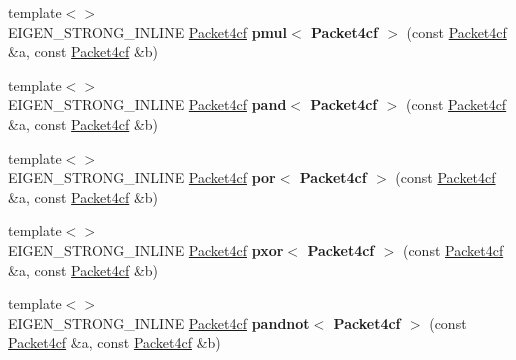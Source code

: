 \begin{DoxyCompactItemize}
\item 
\mbox{\label{namespace_eigen_1_1internal_ad00c03c68ed4f72f2e2a05287fa0cc55}} 
{\footnotesize template$<$$>$ }\\E\+I\+G\+E\+N\+\_\+\+S\+T\+R\+O\+N\+G\+\_\+\+I\+N\+L\+I\+NE \hyperlink{struct_eigen_1_1internal_1_1_packet4cf}{Packet4cf} {\bfseries pmul$<$ Packet4cf $>$} (const \hyperlink{struct_eigen_1_1internal_1_1_packet4cf}{Packet4cf} \&a, const \hyperlink{struct_eigen_1_1internal_1_1_packet4cf}{Packet4cf} \&b)
\item 
\mbox{\label{namespace_eigen_1_1internal_a61c66abe757d9226ade245a7aa933ecc}} 
{\footnotesize template$<$$>$ }\\E\+I\+G\+E\+N\+\_\+\+S\+T\+R\+O\+N\+G\+\_\+\+I\+N\+L\+I\+NE \hyperlink{struct_eigen_1_1internal_1_1_packet4cf}{Packet4cf} {\bfseries pand$<$ Packet4cf $>$} (const \hyperlink{struct_eigen_1_1internal_1_1_packet4cf}{Packet4cf} \&a, const \hyperlink{struct_eigen_1_1internal_1_1_packet4cf}{Packet4cf} \&b)
\item 
\mbox{\label{namespace_eigen_1_1internal_aeabd400bbc8d481593a93d825b3aa3c7}} 
{\footnotesize template$<$$>$ }\\E\+I\+G\+E\+N\+\_\+\+S\+T\+R\+O\+N\+G\+\_\+\+I\+N\+L\+I\+NE \hyperlink{struct_eigen_1_1internal_1_1_packet4cf}{Packet4cf} {\bfseries por$<$ Packet4cf $>$} (const \hyperlink{struct_eigen_1_1internal_1_1_packet4cf}{Packet4cf} \&a, const \hyperlink{struct_eigen_1_1internal_1_1_packet4cf}{Packet4cf} \&b)
\item 
\mbox{\label{namespace_eigen_1_1internal_a44b281130b1a609b17f9bd126fa2573d}} 
{\footnotesize template$<$$>$ }\\E\+I\+G\+E\+N\+\_\+\+S\+T\+R\+O\+N\+G\+\_\+\+I\+N\+L\+I\+NE \hyperlink{struct_eigen_1_1internal_1_1_packet4cf}{Packet4cf} {\bfseries pxor$<$ Packet4cf $>$} (const \hyperlink{struct_eigen_1_1internal_1_1_packet4cf}{Packet4cf} \&a, const \hyperlink{struct_eigen_1_1internal_1_1_packet4cf}{Packet4cf} \&b)
\item 
\mbox{\label{namespace_eigen_1_1internal_aa0c1c1d1635c732bec230b7643fb811d}} 
{\footnotesize template$<$$>$ }\\E\+I\+G\+E\+N\+\_\+\+S\+T\+R\+O\+N\+G\+\_\+\+I\+N\+L\+I\+NE \hyperlink{struct_eigen_1_1internal_1_1_packet4cf}{Packet4cf} {\bfseries pandnot$<$ Packet4cf $>$} (const \hyperlink{struct_eigen_1_1internal_1_1_packet4cf}{Packet4cf} \&a, const \hyperlink{struct_eigen_1_1internal_1_1_packet4cf}{Packet4cf} \&b)

\end{DoxyCompactItemize}
